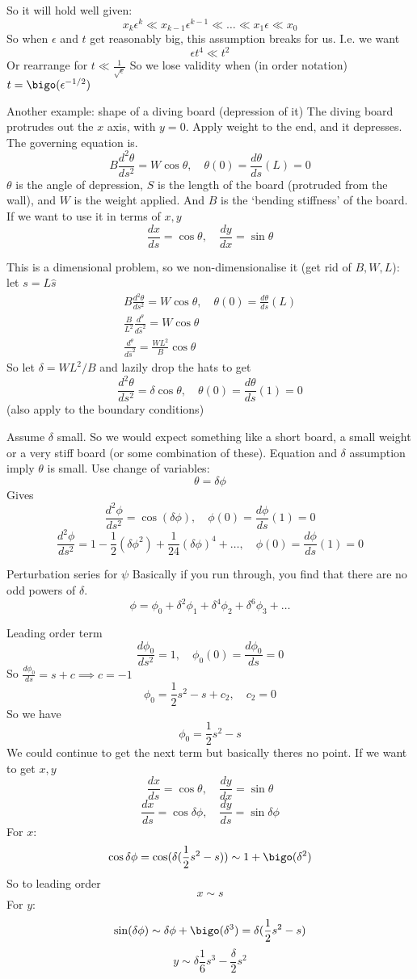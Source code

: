\documentclass{/home/janmebows/Documents/LatexTemplates/myassignment}
\begin{document}
So it will hold well given:
\[x_k \epsilon^k \ll x_{k-1}\epsilon^{k-1} \ll \hdots \ll x_1\epsilon \ll x_0\]
So when $\epsilon$ and $t$ get reasonably big, this assumption breaks for us.
I.e. we want
\[\epsilon t^4 \ll t^2\]
Or rearrange for $t \ll \frac{1}{\sqrt{\epsilon}}$ 
So we lose validity when (in order notation) $t = \bigo(\epsilon^{-1/2})$

Another example: shape of a diving board (depression of it)
The diving board protrudes out the $x$ axis, with $y=0$. Apply weight to the end, and it depresses.
The governing equation is.
\[B \frac{d^2\theta}{ds^2} = W \cos\theta, \quad \theta(0) = \frac{d\theta}{ds}(L) = 0\]
$\theta$ is the angle of depression, $S$ is the length of the board (protruded from the wall), and $W$ is the weight applied. And $B$ is the `bending stiffness' of the board.
If we want to use it in terms of $x,y$
\[\frac{dx}{ds} = \cos\theta, \quad \frac{dy}{dx} = \sin\theta\]

This is a dimensional problem, so we non-dimensionalise it (get rid of $B,W,L$): let $s = L\hat{s}$
\begin{align*}
    B \frac{d^2\theta}{ds^2} = W \cos\theta, \quad \theta(0) = \frac{d\theta}{ds}(L)\\
    \frac{B}{L^2} \frac{d^\theta}{d\hat{s}^2} = W \cos\theta\\
    \frac{d^\theta}{d\hat{s}^2} = \frac{WL^2}{B} \cos\theta
\end{align*}
So let $\delta = WL^2/B$ and lazily drop the hats to get
\[\frac{d^2\theta}{ds^2} = \delta \cos\theta, \quad \theta(0) = \frac{d\theta}{ds}(1) = 0\]
(also apply to the boundary conditions)


Assume $\delta$ small. So we would expect something like a short board, a small weight or a very stiff board (or some combination of these).
Equation and $\delta$ assumption imply $\theta$ is small. Use change of variables:
\[\theta = \delta\phi\]
Gives
\[\frac{d^2\phi}{ds^2} = \cos(\delta\phi), \quad \phi(0) = \frac{d\phi}{ds} (1) = 0\]
\[\frac{d^2\phi}{ds^2} = 1 - \frac12 (\delta\phi^2) + \frac1{24}(\delta\phi)^4 + \hdots, \quad \phi(0) = \frac{d\phi}{ds} (1) = 0\]

Perturbation series for $\psi$
Basically if you run through, you find that there are no odd powers of $\delta$.
\[\phi = \phi_0 + \delta^2 \phi_1 + \delta^4 \phi_2 + \delta^6\phi_3 + \hdots\]

Leading order term
\[\frac{d\phi_0}{ds^2} = 1, \quad \phi_0(0) = \frac{d\phi_0}{ds} = 0\]
So $\frac{d\phi_0}{ds} = s+c \implies c=-1$
\[\phi_0 = \frac12 s^2 - s + c_2, \quad c_2 = 0 \]
So we have
\[\phi_0 = \frac12 s^2 -s\]
We could continue to get the next term but basically theres no point.
If we want to get $x,y$
\[\frac{dx}{ds} = \cos\theta, \quad \frac{dy}{dx} = \sin\theta\]
\[\frac{dx}{ds} = \cos\delta\phi, \quad \frac{dy}{ds} = \sin\delta\phi\]
For $x$:
\[\cos\delta\phi = \cos(\delta(\frac12 s^2 - s)) \sim 1 + \bigo(\delta^2)\]
So to leading order
\[x \sim s\]
For $y$:
\[\sin(\delta\phi) \sim \delta\phi + \bigo(\delta^3) = \delta (\frac12 s^2 -s)\]
\[y \sim \delta \frac16 s^3 - \frac{\delta}{2} s^2 \]
\end{document}
